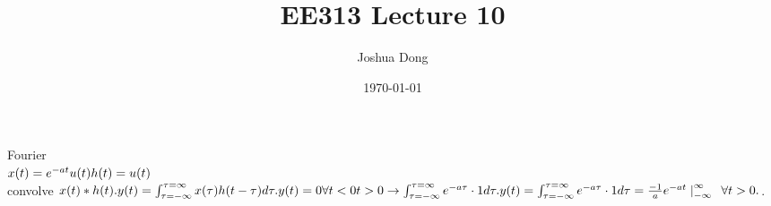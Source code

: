 \documentclass{article}
\begin{document}
\title{EE313\: Lecture 10}
\author{Joshua Dong}
\date{\today}
\maketitle

Fourier
\\$x(t) = e^{-at}u(t)
\\h(t) = u(t)$
\\convolve $x(t) * h(t).
\\y(t) = \int_{\tau=-\infty}^{\tau=\infty}x(\tau)h(t-\tau)d\tau.
\\y(t) = 0 \forall t < 0
\\t > 0 \rightarrow \int_{\tau=-\infty}^{\tau=\infty}e^{-a\tau} \cdot 1 d\tau.
\\y(t) = \int_{\tau=-\infty}^{\tau=\infty}e^{-a\tau} \cdot 1 d\tau =
\frac{-1}{a}e^{-at} \left. \right|_{-\infty}^\infty
\;\; \forall t > 0.
\\$.
\end{document}
